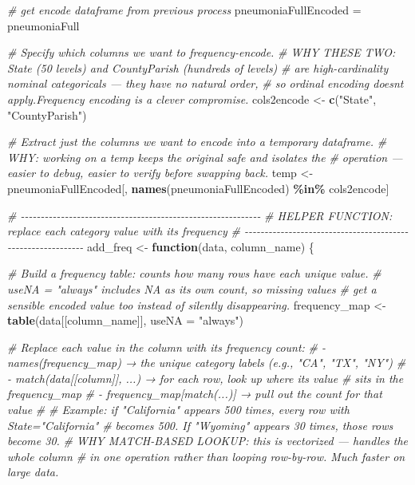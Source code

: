 \documentclass[
]{article}
\newenvironment{Shaded}{\begin{snugshade}}{\end{snugshade}}
\newcommand{\AttributeTok}[1]{\textcolor[rgb]{0.13,0.29,0.53}{#1}}
\newcommand{\CommentTok}[1]{\textcolor[rgb]{0.56,0.35,0.01}{\textit{#1}}}
\newcommand{\ControlFlowTok}[1]{\textcolor[rgb]{0.13,0.29,0.53}{\textbf{#1}}}
\newcommand{\FunctionTok}[1]{\textcolor[rgb]{0.13,0.29,0.53}{\textbf{#1}}}
\newcommand{\NormalTok}[1]{#1}
\newcommand{\OtherTok}[1]{\textcolor[rgb]{0.56,0.35,0.01}{#1}}
\newcommand{\SpecialCharTok}[1]{\textcolor[rgb]{0.81,0.36,0.00}{\textbf{#1}}}
\newcommand{\StringTok}[1]{\textcolor[rgb]{0.31,0.60,0.02}{#1}}
\begin{document}
\begin{Shaded}
\begin{Highlighting}[]
\CommentTok{\# get encode dataframe from previous process}
\NormalTok{pneumoniaFullEncoded }\OtherTok{=}\NormalTok{ pneumoniaFull}

\CommentTok{\# Specify which columns we want to frequency{-}encode.}
\CommentTok{\# WHY THESE TWO: State (50 levels) and CountyParish (hundreds of levels) }
\CommentTok{\# are high{-}cardinality nominal categoricals — they have no natural order, }
\CommentTok{\# so ordinal encoding doesn\textquotesingle{}t apply.Frequency encoding is a clever compromise.}
\NormalTok{cols2encode }\OtherTok{\textless{}{-}} \FunctionTok{c}\NormalTok{(}\StringTok{"State"}\NormalTok{, }
               \StringTok{"CountyParish"}\NormalTok{)}

\CommentTok{\# Extract just the columns we want to encode into a temporary dataframe.}
\CommentTok{\# WHY: working on a temp keeps the original safe and isolates the }
\CommentTok{\# operation — easier to debug, easier to verify before swapping back.}
\NormalTok{temp }\OtherTok{\textless{}{-}}\NormalTok{ pneumoniaFullEncoded[, }\FunctionTok{names}\NormalTok{(pneumoniaFullEncoded) }\SpecialCharTok{\%in\%}\NormalTok{ cols2encode]}

\CommentTok{\# {-}{-}{-}{-}{-}{-}{-}{-}{-}{-}{-}{-}{-}{-}{-}{-}{-}{-}{-}{-}{-}{-}{-}{-}{-}{-}{-}{-}{-}{-}{-}{-}{-}{-}{-}{-}{-}{-}{-}{-}{-}{-}{-}{-}{-}{-}{-}{-}{-}{-}{-}{-}{-}{-}{-}{-}{-}{-}{-}{-}}
\CommentTok{\# HELPER FUNCTION: replace each category value with its frequency}
\CommentTok{\# {-}{-}{-}{-}{-}{-}{-}{-}{-}{-}{-}{-}{-}{-}{-}{-}{-}{-}{-}{-}{-}{-}{-}{-}{-}{-}{-}{-}{-}{-}{-}{-}{-}{-}{-}{-}{-}{-}{-}{-}{-}{-}{-}{-}{-}{-}{-}{-}{-}{-}{-}{-}{-}{-}{-}{-}{-}{-}{-}{-}}
\NormalTok{add\_freq }\OtherTok{\textless{}{-}} \ControlFlowTok{function}\NormalTok{(data, column\_name) \{}
  
  \CommentTok{\# Build a frequency table: counts how many rows have each unique value.}
  \CommentTok{\# useNA = "always" includes NA as its own count, so missing values }
  \CommentTok{\# get a sensible encoded value too instead of silently disappearing.}
\NormalTok{  frequency\_map }\OtherTok{\textless{}{-}} \FunctionTok{table}\NormalTok{(data[[column\_name]], }\AttributeTok{useNA =} \StringTok{"always"}\NormalTok{)}
  
  \CommentTok{\# Replace each value in the column with its frequency count:}
  \CommentTok{\#   {-} names(frequency\_map)        → the unique category labels (e.g., "CA", "TX", "NY")}
  \CommentTok{\#   {-} match(data[[column]], ...)  → for each row, look up where its value }
  \CommentTok{\#                                   sits in the frequency\_map}
  \CommentTok{\#   {-} frequency\_map[match(...)]   → pull out the count for that value}
  \CommentTok{\# }
  \CommentTok{\# Example: if "California" appears 500 times, every row with State="California" }
  \CommentTok{\# becomes 500. If "Wyoming" appears 30 times, those rows become 30.}
  \CommentTok{\# WHY MATCH{-}BASED LOOKUP: this is vectorized — handles the whole column }
  \CommentTok{\# in one operation rather than looping row{-}by{-}row. Much faster on large data.}
  

\end{Highlighting}
\end{Shaded}
\end{document}
